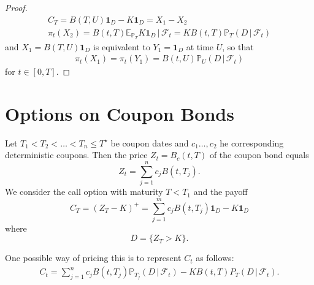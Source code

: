 \documentclass[10pt, oneside, reqno]{amsbook}
\theoremstyle{plain}%
\theoremstyle{definition}
\theoremstyle{remark}
\newcommand{\given}{ \, | \,}
\newcommand{\sigf}{\mathcal{F}}
\newcommand{\E}{\mathbb{E}}
\renewcommand{\P}{\mathbb{P}}
\numberwithin{equation}{chapter}
\begin{document}
\begin{proof}
	\begin{align*}
		C_T = B(T, U) \mathbf{1}_D - K \mathbf{1}_D = X_1 - X_2 \\
		\pi_t(X_2) = B(t, T) \E_{\P_T} K \mathbf{1}_D \given \sigf_t = K B(t, T) \P_T (D \given \sigf_t)
	\end{align*} and $X_1 = B(T, U) \mathbf{1}_D$ is equivalent to $Y_1 = \mathbf{1}_D$ at time $U$, so that \begin{align*}
		\pi_t(X_1) = \pi_t(Y_1) = B(t, U) \P_{U}(D \given \sigf_t)
	\end{align*} for $t \in [0, T]$.
\end{proof}

\section{Options on Coupon Bonds} %
\label{sec:options_on_coupon_bonds}
Let $T_1 < T_2 < \dots < T_n \leq T^\star$ be coupon dates and $c_1 \dots, c_2$ he corresponding deterministic coupons.  Then the price $Z_t = B_c(t, T)$ of the coupon bond equals \[
	Z_t = \sum_{j=1}^n c_j B(t, T_j).
\]  We consider the call option with maturity $T < T_1$ and the payoff \[
	C_T = (Z_T - K)^+ = \sum_{j=1}^m c_j B(t, T_j) \mathbf{1}_D - K \mathbf{1}_D
\]   where \[
	D = \{ Z_T > K \}.
\]

One possible way of pricing this is to represent $C_t$ as follows: \begin{align*}
	C_t = \sum_{j=1}^n c_j B(t, T_j) \P_{T_j}(D \given \sigf_t) - K B(t, T)P_T(D \given \sigf_t).
\end{align*}
\end{document}
